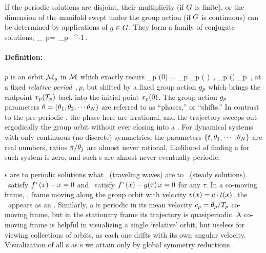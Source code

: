 If the periodic solutions are disjoint,
their multiplicity (if $G$ is
finite), or the dimension of the
manifold swept under the group action (if $G$ is
continuous) can be determined by applications of $g \in
G$. They form a family of conjugate solutions,
\beq
	\pS_{\LieEl\, p}=\LieEl\, \pS_p \, \LieEl^{-1}\,.

\paragraph{Definition:
           \Rpo}
$p$ is an orbit $\pS_p$ in {\statesp} $\pS$
which exactly recurs
\beq
\ssp_p (0) = \LieEl_p \ssp_p ( )
    \,,\qquad
\ssp_p (\tau) \in \pS_p
    \,,
\label{RPOrelper1}
\eeq
at a fixed {\em relative period} $\period{p}$, but
shifted by a fixed group action ${g_p}$
which brings the endpoint $x_p ({T_{p}} ) $
back into the initial point $x_p (0) $.
The group action ${g_p}$ parameters
$\theta = (\theta_1,\theta_2,\cdots\theta_N)$
are referred to as ``phases,'' or ``shifts.''
%
In contrast to the pre-periodic , the
phase here are irrational, and the trajectory sweeps out
ergodically the group orbit without ever closing into a \po.
For dynamical systems with only continuous (no discrete)
symmetries, the parameters $\{t,\theta_1,\cdots,\theta_N\}$
are real numbers, ratios $\pi/\theta_j$ are almost never
rational, likelihood of finding a {\po} for such system is
{zero}, and such \rpo s are almost never eventually periodic.


\Rpo s are to periodic solutions what \reqva\ (traveling
waves) are to \eqva\ (steady solutions). \Eqva\ satisfy
$f^\tau(x) - x = 0$ and \reqva\ satisfy $f^\tau(x) -
g( \tau) \, x= 0$ for any $\tau$. In a co-moving
frame, \ie, frame moving along the group orbit with velocity
$v(x) = c \cdot t(x)$, the \reqv\
appears as an \eqv. Similarly, a {\rpo} is periodic in its
mean velocity $c_p=\theta_p/{T_{p}}$ co-moving
frame, but in the
stationary frame its trajectory is quasiperiodic. A co-moving
frame is helpful in visualizing a single `relative' orbit,
but useless for viewing collections of orbits, as each one
drifts with its own angular velocity. Visualization of all
\rpo s as \po s we attain only by global symmetry reductions.


